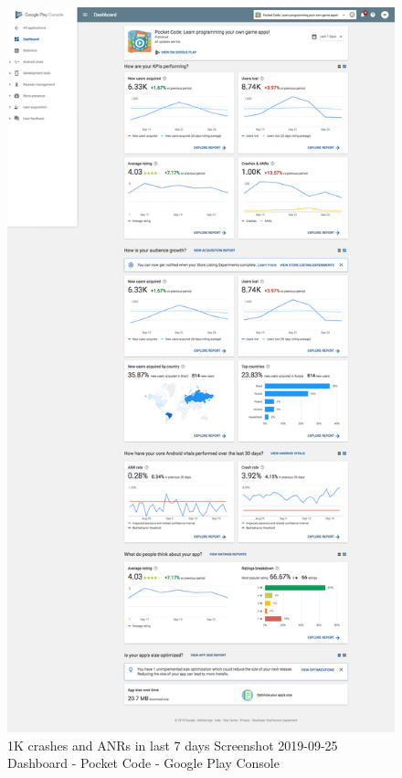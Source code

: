 \begin{figure}
    \centering
    \includegraphics{images/android-vitals-screenshots/catrobat/1K crashes and ANRs in last 7 days Screenshot_2019-09-25 Dashboard - Pocket Code Learn programming your own game apps - Google Play Console.png}
    \caption[Google Play Console Dashboard for Catrobat]{1K crashes and ANRs in last 7 days Screenshot 2019-09-25 Dashboard - Pocket Code - Google Play Console}
    \label{fig:gpc-dashboard-catrobat-for-analysis}
\end{figure}

